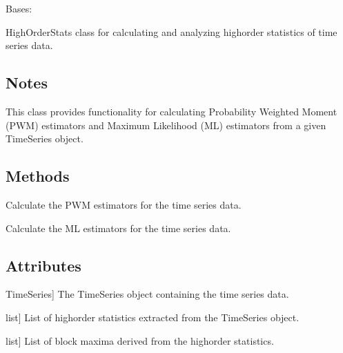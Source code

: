 \documentclass[a4paper,11pt,openany,english]{sphinxmanual}
\begin{document}
\begin{fulllineitems}
\label{\detokenize{api_topt:xtremes.topt.HighOrderStats}}
\pysigstartsignatures
{}
\pysigstopsignatures
\sphinxAtStartPar
Bases: 

\sphinxAtStartPar
HighOrderStats class for calculating and analyzing high\sphinxhyphen{}order statistics of time series data.


\subsection{Notes}
\label{\detokenize{api_topt:notes}}
\sphinxAtStartPar
This class provides functionality for calculating Probability Weighted Moment (PWM) estimators and
Maximum Likelihood (ML) estimators from a given TimeSeries object.


\subsection{Methods}
\label{\detokenize{api_topt:id8}}\begin{description}
\sphinxAtStartPar
Calculate the PWM estimators for the time series data.

\sphinxAtStartPar
Calculate the ML estimators for the time series data.

\end{description}


\subsection{Attributes}
\label{\detokenize{api_topt:id9}}\begin{description}
\sphinxlineitem{TimeSeries}{[}TimeSeries{]}
\sphinxAtStartPar
The TimeSeries object containing the time series data.

\sphinxlineitem{high\_order\_stats}{[}list{]}
\sphinxAtStartPar
List of high\sphinxhyphen{}order statistics extracted from the TimeSeries object.

\sphinxlineitem{blockmaxima}{[}list{]}
\sphinxAtStartPar
List of block maxima derived from the high\sphinxhyphen{}order statistics.


\end{description}
\end{fulllineitems}
\end{document}
